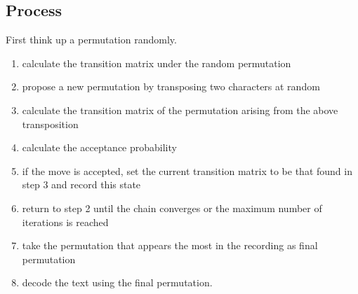 \documentclass{acmtog} %
\begin{document}
\subsection{Process}
First think up a permutation randomly.
\begin{enumerate}
    \item calculate the transition matrix  under the random permutation 
    \item propose a new permutation by transposing two characters at random
    \item calculate the transition matrix of the permutation arising from the above
    transposition
    \item calculate the acceptance probability
    \item if the move is accepted, set the current transition matrix to be that found in step 3 and record this state
    \item return to step 2 until the chain converges or the maximum number of
    iterations is reached
    \item take the permutation that appears the most in the recording as final permutation
    \item decode the text using the final permutation.
\end{enumerate}
\end{document}
